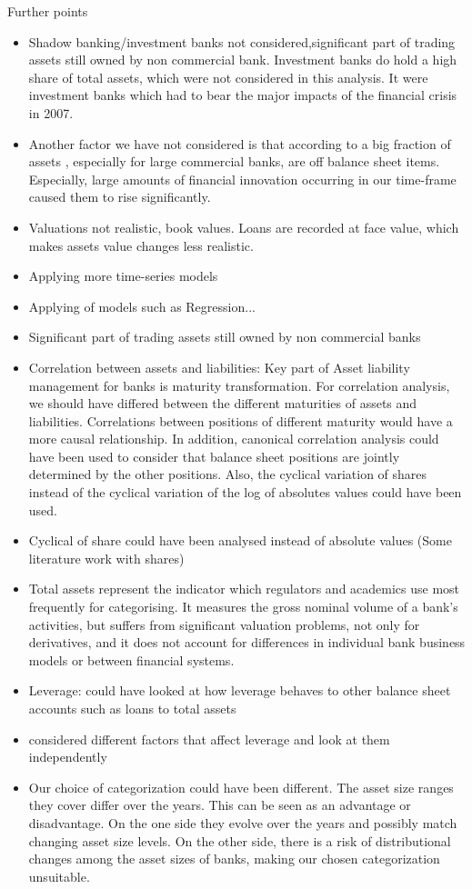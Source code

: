 \documentclass[12pt, a4paper]{article} %
\begin{document}
Further points
\begin{itemize}
\item Shadow banking/investment banks not considered,significant part of trading assets still owned by non commercial bank. Investment banks do hold a high share of total assets, which were not considered in this analysis. It were investment banks which had to bear the major impacts of the financial crisis in 2007. 
\item  Another factor we have not considered is that according to \cite{Sebnem Kalemli-Ozcan, Bent Sorensen,Sevcan Yesiltas 2011} a big fraction of assets , especially for large commercial banks, are off balance sheet items. Especially, large amounts of financial innovation occurring in our time-frame caused them to rise significantly.
\item Valuations not realistic, book values. Loans are recorded at face value, which makes assets value changes less realistic. 
\item Applying more time-series models
\item Applying of models such as Regression...
\item Significant part of trading assets still owned by non commercial banks
\item Correlation between assets and liabilities: Key part of Asset liability management for banks is maturity transformation. For correlation analysis, we should have differed between the different maturities of assets and liabilities. Correlations between positions of different maturity would have a more causal relationship. In addition, canonical correlation analysis could have been used to consider that balance sheet positions are jointly determined by the other positions. Also, the cyclical variation of shares instead of the cyclical variation of the log of absolutes values could have been used.
\item Cyclical of share could have been analysed instead of absolute values (Some literature work with shares)
\item Total assets represent the indicator which regulators and academics use most
frequently for categorising. It measures the gross nominal volume of a bank’s activities, but
suffers from significant valuation problems, not only for derivatives, and it does
not account for differences in individual bank business models or between
financial systems.
\item Leverage: could have looked at how leverage behaves to other balance sheet accounts such as loans to total assets
\item considered different factors that affect leverage and look at them independently
\item Our choice of categorization could have been different. The asset size ranges they cover differ over the years. This can be seen as an advantage or disadvantage. On the one side they evolve over the years and possibly match changing asset size levels. On the other side, there is a risk of distributional changes among the asset sizes of banks, making our chosen categorization unsuitable.  
\end{itemize}
 
\end{document}
